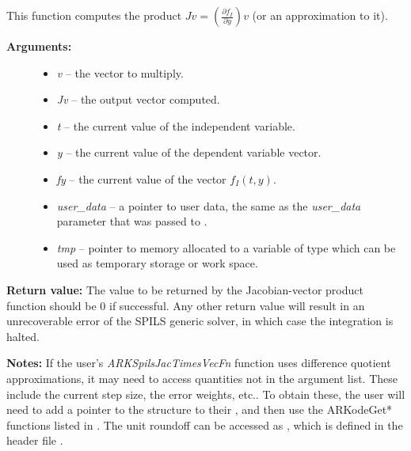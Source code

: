 \documentclass[letterpaper,10pt,english]{sphinxmanual}
\begin{document}
\begin{fulllineitems}
\label{c_interface/User_supplied:c.ARKSpilsJacTimesVecFn}
This function computes the product \(Jv =
\left(\frac{\partial f_I}{\partial y}\right)v\) (or an approximation to it).
\begin{description}
\item[{\textbf{Arguments:}}] \leavevmode\begin{itemize}
\item {} 
\emph{v} -- the vector to multiply.

\item {} 
\emph{Jv} -- the output vector computed.

\item {} 
\emph{t} -- the current value of the independent variable.

\item {} 
\emph{y} -- the current value of the dependent variable vector.

\item {} 
\emph{fy} -- the current value of the vector \(f_I(t,y)\).

\item {} 
\emph{user\_data} -- a pointer to user data, the same as the
\emph{user\_data} parameter that was passed to {\hyperref[c_interface/User_callable:c.ARKodeSetUserData]{\emph{}}}.

\item {} 
\emph{tmp} -- pointer to memory allocated to a variable of type
 which can be used as temporary storage or work space.

\end{itemize}

\end{description}

\textbf{Return value:}
The value to be returned by the Jacobian-vector product
function should be 0 if successful. Any other return value will
result in an unrecoverable error of the SPILS generic solver,
in which case the integration is halted.

\textbf{Notes:} If the user's \emph{ARKSpilsJacTimesVecFn} function uses
difference quotient approximations, it may need to access
quantities not in the argument list.  These include the current
step size, the error weights, etc..  To obtain these, the
user will need to add a pointer to the  structure to
their , and then use the ARKodeGet* functions listed
in {\hyperref[c_interface/User_callable:cinterface-optionaloutputs]{\emph{}}}. The unit roundoff can be
accessed as , which is defined in the header
file .

\end{fulllineitems}
\end{document}

